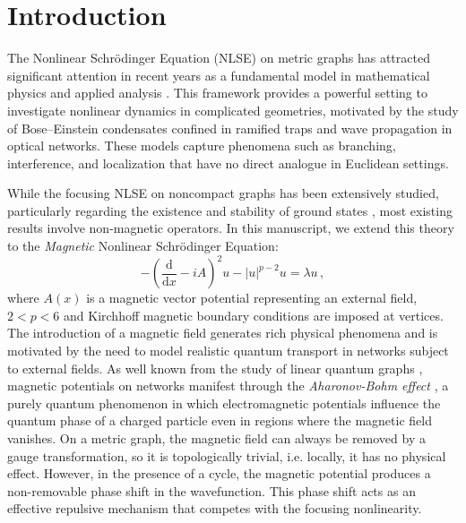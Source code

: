 \documentclass[12pt,a4paper]{amsart}
\theoremstyle{definition}
\theoremstyle{plain}
\numberwithin{equation}{section}
\begin{document}
\maketitle

\section{Introduction}

The Nonlinear Schrödinger Equation (NLSE) on metric graphs has attracted significant attention in recent years as a fundamental model in mathematical physics and applied analysis \cite{Kairzhan2022, Noja2014}. This framework provides a powerful setting to investigate nonlinear dynamics in complicated geometries, motivated by the study of Bose--Einstein condensates confined in ramified traps \cite{Amico2021} and wave propagation in optical networks. These models capture phenomena such as branching, interference, and localization that have no direct analogue in Euclidean settings.

While the focusing NLSE on noncompact graphs has been extensively studied, particularly regarding the existence and stability of ground states \cite{Adami2012, Adami2015, Adami2016, Adami2017, Adami2019}, most existing results involve non-magnetic operators. In this manuscript, we extend this theory to the \emph{Magnetic} Nonlinear Schrödinger Equation:
\begin{equation}
    -\left(\frac{\textrm{d}}{\textrm{d}x} - iA\right)^2 u - |u|^{p-2}u = \lambda u\,,
\end{equation}
where $A(x)$ is a magnetic vector potential representing an external field, $2<p<6$ and Kirchhoff magnetic boundary conditions are imposed at vertices.
The introduction of a magnetic field generates rich physical phenomena and is motivated by the need to model realistic quantum transport in networks subject to external fields. As well known from the study of linear quantum graphs \cite{ExnerKovarik2015,ExnerSeba1989, KostrykinSchrader2003}, magnetic potentials on networks manifest through the \emph{Aharonov-Bohm effect} \cite{aharonov1959significance}, a purely quantum phenomenon in which electromagnetic potentials influence the quantum phase of a charged particle even in regions where the magnetic field vanishes. On a metric graph, the magnetic field can always be removed by a gauge transformation, so it is topologically trivial, i.e. locally, it has no physical effect. However, in the presence of a cycle, the magnetic potential produces a non-removable phase shift in the wavefunction. This phase shift acts as an effective repulsive mechanism that competes with the focusing nonlinearity.
\end{document}
